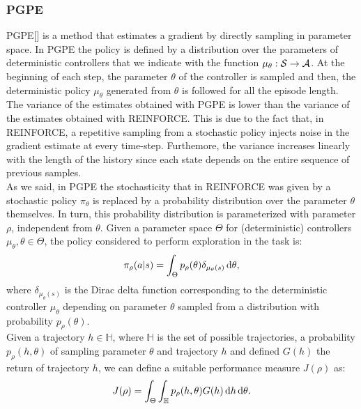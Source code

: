 \subsubsection{PGPE} \label{subsec:pgpe}
\acf{PGPE}[\citet{sehnke2008PolicyGradient}] is a method that estimates a gradient by directly sampling in parameter space. In \ac{PGPE} the policy is defined by a distribution over the parameters of deterministic controllers that we indicate with the function $\mu_{\theta}: \mathcal{S} \to \mathcal{A}$. At the beginning of each step, the parameter $\theta$ of the controller is sampled and then, the deterministic policy $\mu_{\theta}$ generated from $\theta$ is followed for all the episode length.\\
\newline
The variance of the estimates obtained with \ac{PGPE} is lower than the variance of the estimates obtained with REINFORCE. This is due to the fact that, in REINFORCE, a repetitive sampling from a stochastic policy injects noise in the gradient estimate at every time-step. Furthemore, the variance increases linearly with the length of the history since each state depends on the entire sequence of previous samples.\\
\newline
As we said, in \ac{PGPE} the stochasticity that in REINFORCE was given by a stochastic policy $\pi_{\theta}$ is replaced by a probability distribution over the parameter $\theta$ themselves. In turn, this probability distribution is parameterized with parameter $\rho$, independent from $\theta$. Given a parameter space $\Theta$ for (deterministic) controllers $\mu_{\theta}, \theta \in \Theta$, the policy considered to perform exploration in the task is:
\begin{align}
\pi_{\rho}(a|s) = \int_{\Theta} p_{\rho}(\theta) \delta_{\mu_{\theta}(s)}\,\mathrm{d} \theta,
\end{align}
where $\delta_{\mu_{\theta}(s)}$ is the Dirac delta function corresponding to the deterministic controller $\mu_{\theta}$ depending on parameter $\theta$ sampled from a distribution with probability $p_{\rho}(\theta)$.\\
\newline
Given a trajectory $h \in \mathbb{H}$, where $\mathbb{H}$ is the set of possible trajectories, a probability $p_{\rho}(h, \theta)$ of sampling parameter $\theta$ and trajectory $h$ and defined $G(h)$ the return of trajectory $h$, we can define a suitable performance measure $J(\rho)$ as:
\begin{align}
J(\rho) = \int_{\Theta} \int_{\mathbb{H}} p_{\rho}(h, \theta) G(h) \,\mathrm{d} h \,\mathrm{d} \theta. \label{eq:pgpej}
\end{align}
